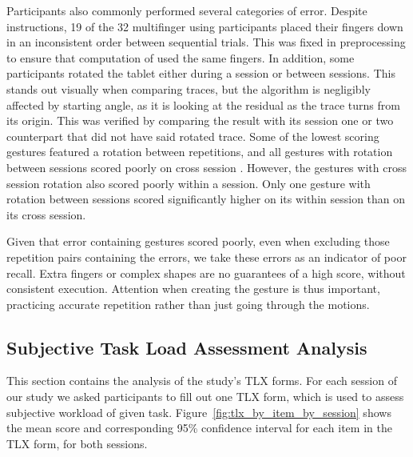 \documentclass{sig-alternate-10pt}
\begin{document}
Participants also commonly performed several categories of error. Despite instructions, 19 of the 32 multifinger using participants placed their fingers down in an inconsistent order between sequential trials. This was fixed in preprocessing to ensure that computation of  used the same fingers. In addition, some participants rotated the tablet either during a session or between sessions. This stands out visually when comparing traces, but the algorithm is negligibly affected by starting angle, as it is looking at the residual as the trace turns from its origin. This was verified by comparing the result with its session one or two counterpart that did not have said rotated trace. Some of the lowest scoring gestures featured a rotation between repetitions, and all gestures with rotation between sessions scored poorly on cross session . However, the gestures with cross session rotation also scored poorly within a session. Only one gesture with rotation between sessions scored significantly higher on its within session  than on its cross session.

Given that error containing gestures scored poorly, even when excluding those repetition pairs containing the errors, we take these errors as an indicator of poor recall. Extra fingers or complex shapes are no guarantees of a high score, without consistent execution. Attention when creating the gesture is thus important, practicing accurate repetition rather than just going through the motions. 





























\subsection{Subjective Task Load Assessment \newline Analysis}






This section contains the analysis of the study's TLX forms. For each session of our study we asked participants to fill out one TLX form, which is used to assess subjective workload of given task. Figure~\ref{fig:tlx_by_item_by_session} shows the mean score and corresponding 95\% confidence interval for each item in the TLX form, for both sessions. 
\end{document}
